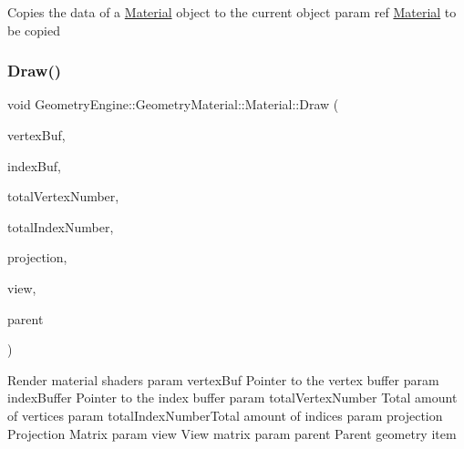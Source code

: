 Copies the data of a \mbox{\hyperlink{class_geometry_engine_1_1_geometry_material_1_1_material}{Material}} object to the current object param ref \mbox{\hyperlink{class_geometry_engine_1_1_geometry_material_1_1_material}{Material}} to be copied \mbox{\label{class_geometry_engine_1_1_geometry_material_1_1_material_ae337c74e4f500d0a881779c2c3495908}} 
\subsubsection{\texorpdfstring{Draw()}{Draw()}}
{\footnotesize\ttfamily void Geometry\+Engine\+::\+Geometry\+Material\+::\+Material\+::\+Draw (\begin{DoxyParamCaption}\item[{Q\+Open\+G\+L\+Buffer $\ast$}]{vertex\+Buf,  }\item[{Q\+Open\+G\+L\+Buffer $\ast$}]{index\+Buf,  }\item[{unsigned int}]{total\+Vertex\+Number,  }\item[{unsigned int}]{total\+Index\+Number,  }\item[{const Q\+Matrix4x4 \&}]{projection,  }\item[{const Q\+Matrix4x4 \&}]{view,  }\item[{const \mbox{\hyperlink{class_geometry_engine_1_1_geometry_world_item_1_1_geometry_item_1_1_geometry_item}{Geometry\+World\+Item\+::\+Geometry\+Item\+::\+Geometry\+Item}} \&}]{parent }\end{DoxyParamCaption})\hspace{0.3cm}{\ttfamily [virtual]}}

Render material shaders param vertex\+Buf Pointer to the vertex buffer param index\+Buffer Pointer to the index buffer param total\+Vertex\+Number Total amount of vertices param total\+Index\+Number\+Total amount of indices param projection Projection Matrix param view View matrix param parent Parent geometry item \mbox{\label{class_geometry_engine_1_1_geometry_material_1_1_material_a0070eab6e5fe86dc05dc69f2e37b9072}} 

